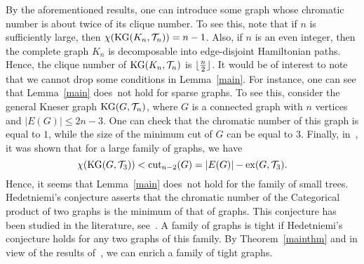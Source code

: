 \documentclass[11pt]{article}
\begin{document}
By the aforementioned results, one can introduce some graph whose chromatic number is about twice of its clique number. To see this, 
note that if $n$ is sufficiently large, then $\chi({\rm KG}(K_n,{\cal T}_n))=n-1$. Also, 
if $n$ is an even integer,
then the complete graph $K_n$ is decomposable into edge-disjoint Hamiltonian paths. Hence, the clique number of
${\rm KG}(K_n,{\cal T}_n)$ is $\lfloor {n\over 2}\rfloor$.  It would be of interest to note that we cannot drop some conditions in 
Lemma~\ref{main}. For instance, one can see that Lemma~\ref{main} 
does~not hold for sparse graphs. To see this, consider the general Kneser graph ${\rm KG}(G,{\cal T}_n)$, where $G$ is a connected 
graph with $n$ vertices and $|E(G)|\leq 2n-3$.  One can check that 
the chromatic number of this graph is equal to $1$, while the size of the minimum cut of $G$ can be equal to $3$. 
Finally, in~\cite{2014arXiv1401.0138A}, it was shown that 
for a large family of graphs, we have 
$$\chi({\rm KG}(G,{\cal T}_3))< {\rm cut}_{n-2}(G)=|E(G)|-{\rm ex}(G, {\cal T}_{3}).$$ 
Hence, it seems that Lemma~\ref{main} does~not hold for the family of small trees.\\ 

Hedetniemi's conjecture asserts that
the chromatic number of the Categorical product of two graphs is the minimum of
that of graphs. This conjecture has been studied in the literature, see~\cite{2014arXiv1403.4404A, MR2171371, MR2445666, MR2825542}. 
A family of graphs is tight if  Hedetniemi's conjecture holds for any two graphs of this family. 
By Theorem~\ref{mainthm} and  in view of the results of~\cite{2014arXiv1403.4404A}, we can enrich 
a family of tight graphs.\\ 
\end{document}
